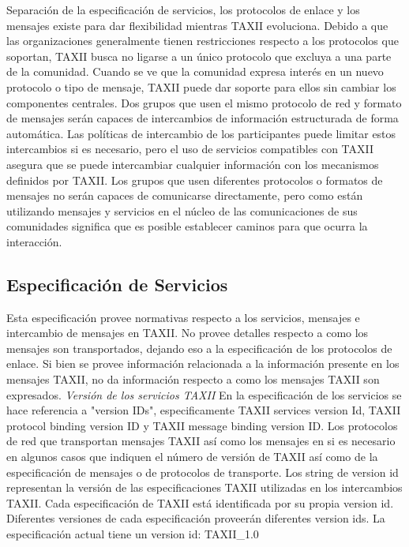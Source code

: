 Separación de la especificación de servicios, los protocolos de enlace y los 
mensajes existe para dar flexibilidad mientras TAXII evoluciona. Debido a que 
las organizaciones generalmente tienen restricciones respecto a los protocolos 
que soportan, TAXII busca no ligarse a un único protocolo que excluya a una 
parte de la comunidad. Cuando se ve que la comunidad expresa interés en un nuevo 
protocolo o tipo de mensaje, TAXII puede dar soporte para ellos sin cambiar los 
componentes centrales.
Dos grupos que usen el mismo protocolo de red y formato de mensajes serán 
capaces de intercambios de información estructurada de forma automática. Las 
políticas de intercambio de los participantes puede limitar estos intercambios 
si es necesario, pero el uso de servicios compatibles con TAXII asegura que 
se puede intercambiar cualquier información con los mecanismos definidos por 
TAXII. Los grupos que usen diferentes protocolos o formatos de mensajes no serán 
capaces de comunicarse directamente, pero como están utilizando mensajes y 
servicios en el núcleo de las comunicaciones de sus comunidades significa que es 
posible establecer caminos para que ocurra la interacción.

\subsection{Especificación de Servicios}
Esta especificación provee normativas respecto a los servicios, mensajes e 
intercambio de mensajes en TAXII. No provee detalles respecto a como los 
mensajes son transportados, dejando eso a la especificación de los protocolos de 
enlace. Si bien se provee información relacionada a la información presente en 
los mensajes TAXII, no da información respecto a como los mensajes TAXII son 
expresados.
\emph{Versión de los servicios TAXII}
En la especificación de los servicios se hace referencia a "version IDs", 
especificamente TAXII services version Id, TAXII protocol binding version ID y 
TAXII message binding version ID. Los protocolos de red que transportan mensajes 
TAXII así como los mensajes en si es necesario en algunos casos que indiquen el 
número de versión de TAXII así como de la especificación de mensajes o de 
protocolos de transporte. Los string de version id representan la versión de las 
especificaciones TAXII utilizadas en los intercambios TAXII. Cada especificación 
de TAXII está identificada por su propia version id. Diferentes versiones de 
cada especificación proveerán diferentes version ids.
La especificación actual tiene un version id: TAXII_1.0


